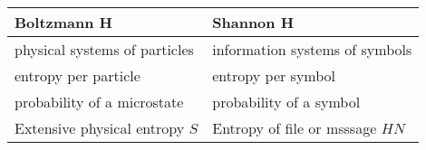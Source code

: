 \begin{tabular}{l | l}
\textbf{Boltzmann H} & \textbf{Shannon H} \\
\hline
physical systems of particles & information systems of symbols \\
entropy per particle & entropy per symbol \\
probability of a microstate & probability of a symbol \\
Extensive physical entropy $S$ & Entropy of file or msssage $HN$ \\

\end{tabular}